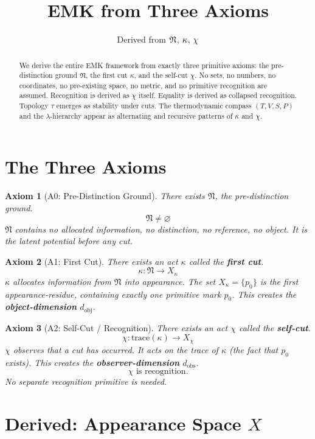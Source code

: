 \documentclass[12pt]{article}
\title{EMK from Three Axioms}
\author{Derived from $\Shunya$, $\cut$, $\selfcut$}
\date{}
\newtheorem{axiom}{Axiom}
\newcommand{\Shunya}{\mathfrak{N}}
\newcommand{\cut}{\kappa}
\newcommand{\selfcut}{\chi}
\begin{document}
\maketitle

\begin{abstract}
We derive the entire EMK framework from exactly three primitive axioms:
the pre-distinction ground $\Shunya$, the first cut $\cut$, and the self-cut $\selfcut$.
No sets, no numbers, no coordinates, no pre-existing space, no metric,
and no primitive recognition are assumed.
Recognition is derived as $\selfcut$ itself.
Equality is derived as collapsed recognition.
Topology $\tau$ emerges as stability under cuts.
The thermodynamic compass $(T,V,S,P)$ and the $\lambda$-hierarchy appear as
alternating and recursive patterns of $\cut$ and $\selfcut$.
\end{abstract}

\section{The Three Axioms}

\begin{axiom}[A0: Pre-Distinction Ground]
There exists $\Shunya$, the pre-distinction ground.
\[
\Shunya \neq \varnothing
\]
$\Shunya$ contains no allocated information, no distinction, no reference, no object.
It is the latent potential before any cut.
\end{axiom}

\begin{axiom}[A1: First Cut]
There exists an act $\cut$ called the \textbf{first cut}.
\[
\cut: \Shunya \longrightarrow X_\cut
\]
$\cut$ allocates information from $\Shunya$ into appearance.
The set $X_\cut = \{p_0\}$ is the first appearance-residue,
containing exactly one primitive mark $p_0$.
This creates the \textbf{object-dimension} $d_{\text{obj}}$.
\end{axiom}

\begin{axiom}[A2: Self-Cut / Recognition]
There exists an act $\selfcut$ called the \textbf{self-cut}.
\[
\selfcut: \text{trace}(\cut) \longrightarrow X_\selfcut
\]
$\selfcut$ observes that a cut has occurred.
It acts on the trace of $\cut$ (the fact that $p_0$ exists).
This creates the \textbf{observer-dimension} $d_{\text{obs}}$.
\[
\boxed{\selfcut \text{ is recognition.}}
\]
No separate recognition primitive is needed.
\end{axiom}

\section{Derived: Appearance Space $X$}
\end{document}
